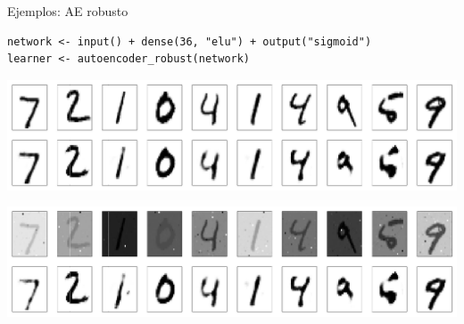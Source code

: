 \begin{frame}{Ejemplos: AE robusto}

\scriptsize
\begin{verbatim}
network <- input() + dense(36, "elu") + output("sigmoid")
learner <- autoencoder_robust(network)
\end{verbatim}
\normalsize

\includegraphics[width=\columnwidth]{imgs/robust}

\includegraphics[width=\columnwidth]{imgs/robust_cauchy}

\end{frame}
